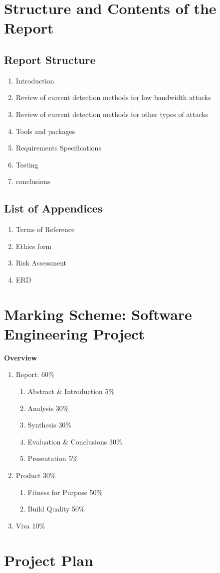 \section{Structure and Contents of the Report}
\subsection{Report Structure}
\begin{enumerate} [topsep=0pt,itemsep=-0ex,partopsep=1ex,parsep=1pt,leftmargin=7ex,label=CH.\arabic*]
     \item Introduction
     \item Review of current detection methods for low bandwidth attacks
     \item Review of current detection methods for other types of attacks
     \item Tools and packages 
     \item Requirements Specifications
     \item Testing
     \item conclusions
\end{enumerate}

\subsection{List of Appendices}
\begin{enumerate} [label=\Alph*)]
    \item Terms of Reference
    \item Ethics form
    \item Risk Assessment
    \item ERD
\end{enumerate}
\section{Marking Scheme: Software Engineering Project }
\textbf{Overview}

\begin{enumerate} [topsep=0pt,itemsep=-0ex,partopsep=1ex,parsep=1pt,label=]
    \item Report: 60\%
\begin{enumerate}[topsep=0pt,itemsep=-1ex,partopsep=1ex,parsep=1ex,label=]
\item Abstract \& Introduction 	5\%
\item Analysis 			30\%
\item Synthesis 			30\%
\item  Evaluation \& Conclusions 	30\%
\item Presentation 			5\%
\end{enumerate}
\item Product 30\%
\begin{enumerate}[topsep=0pt,itemsep=-1ex,partopsep=1ex,parsep=1ex,label=]
\item Fitness for Purpose 		50\%
\item Build Quality 			50\%
\end{enumerate}
\item Viva 10\%
\end{enumerate}

\clearpage

\section{Project Plan}
\noindent
{}
